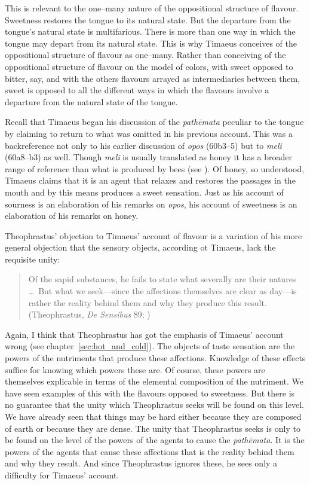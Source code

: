 This is relevant to the one--many nature of the oppositional structure of flavour. Sweetness restores the tongue to its natural state. But the departure from the tongue's natural state is multifarious. There is more than one way in which the tongue may depart from its natural state. This is why Timaeus conceives of the oppositional structure of flavour as one--many. Rather than conceiving of the oppositional structure of flavour on the model of colors, with sweet opposed to bitter, say, and with the others flavours arrayed as intermediaries between them, sweet is opposed to all the different ways in which the flavours involve a departure from the natural state of the tongue.

Recall that Timaeus began his discussion of the \emph{pathēmata} peculiar to the tongue by claiming to return to what was omitted in his previous account. This was a backreference not only to his earlier discussion of \emph{opos} (60b3–5) but to \emph{meli} (60a8--b3) as well. Though \emph{meli} is usually translated as honey it has a broader range of reference than what is produced by bees (see \citealt[254 n6]{Cornford:1935fk}). Of honey, so understood, Timaeus claims that it is an agent that relaxes and restores the passages in the mouth and by this means produces a sweet sensation. Just as his account of sourness is an elaboration of his remarks on \emph{opos}, his account of sweetness is an elaboration of his remarks on honey.

Theophrastus' objection to Timaeus' account of flavour is a variation of his more general objection that the sensory objects, according ot Timaeus, lack the requisite unity:
\begin{quote}
	Of the sapid substances, he fails to state what severally are their natures \ldots\ But what we seek---since the affections themselves are clear as day---is rather the reality behind them and why they produce this result. (Theophrastus, \emph{De Sensibus} 89; \citealt[149]{Stratton:1917vn})
\end{quote}
Again, I think that Theophrastus has got the emphasis of Timaeus' account wrong (see chapter~\ref{sec:hot_and_cold}). The objects of taste sensation are the powers of the nutriments that produce these affections. Knowledge of these effects suffice for knowing which powers these are. Of course, these powers are themselves explicable in terms of the elemental composition of the nutriment. We have seen examples of this with the flavours opposed to sweetness. But there is no guarantee that the unity which Theophrastus seeks will be found on this level. We have already seen that things may be hard either because they are composed of earth or because they are dense. The unity that Theophrastus seeks is only to be found on the level of the powers of the agents to cause the \emph{pathēmata}. It is the powers of the agents that cause these affections that is the reality behind them and why they result. And since Theophrastus ignores these, he sees only a difficulty for Timaeus' account.

